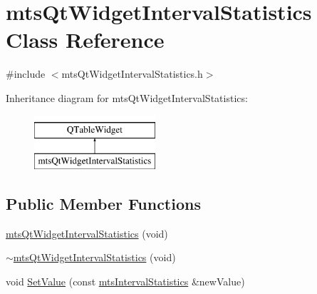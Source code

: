 \hypertarget{classmts_qt_widget_interval_statistics}{\section{mts\-Qt\-Widget\-Interval\-Statistics Class Reference}
\label{classmts_qt_widget_interval_statistics}
}


{\ttfamily \#include $<$mts\-Qt\-Widget\-Interval\-Statistics.\-h$>$}

Inheritance diagram for mts\-Qt\-Widget\-Interval\-Statistics\-:\begin{figure}[H]
\begin{center}
\leavevmode
\includegraphics[height=2.000000cm]{d0/dcf/classmts_qt_widget_interval_statistics}
\end{center}
\end{figure}
\subsection*{Public Member Functions}
\begin{DoxyCompactItemize}
\item 
\hyperlink{classmts_qt_widget_interval_statistics_a394077f43d0df6d596e53729195ec3ed}{mts\-Qt\-Widget\-Interval\-Statistics} (void)
\item 
\hyperlink{classmts_qt_widget_interval_statistics_aaf177bc6e4838b81d078bd04d971d97d}{$\sim$mts\-Qt\-Widget\-Interval\-Statistics} (void)
\item 
void \hyperlink{classmts_qt_widget_interval_statistics_a02d85a7b46366214eaad37d202096534}{Set\-Value} (const \hyperlink{classmts_interval_statistics}{mts\-Interval\-Statistics} \&new\-Value)
\end{DoxyCompactItemize}

